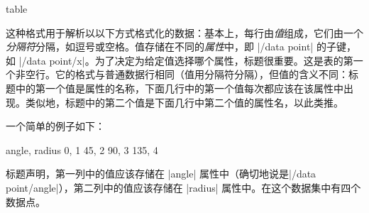 \begin{dataformat}{table}

    这种格式用于解析以以下方式格式化的数据：基本上，每行由\emph{值}组成，它们由一个\emph{分隔符}分隔，如逗号或空格。值存储在不同的\emph{属性}中，即 |/data point| 的子键，如 |/data point/x|。为了决定为给定值选择哪个属性，标题很重要。这是表的第一个非空行。它的格式与普通数据行相同（值用分隔符分隔），但值的含义不同：标题中的第一个值是属性的名称，下面几行中的第一个值每次都应该在该属性中出现。类似地，标题中的第二个值是下面几行中第二个值的属性名，以此类推。


    一个简单的例子如下：
\begin{codeexample}
angle, radius
0, 1
45, 2
90, 3
135, 4
\end{codeexample}
    标题声明，第一列中的值应该存储在 |angle| 属性中（确切地说是|/data point/angle|），第二列中的值应该存储在 |radius| 属性中。在这个数据集中有四个数据点。



\end{dataformat}
